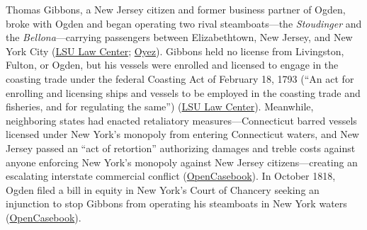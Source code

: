 \documentclass[12pt]{article}
\begin{document}
Thomas Gibbons, a New Jersey citizen and former business partner of Ogden, broke with Ogden and began operating two rival steamboats---the \textit{Stoudinger} and the \textit{Bellona}---carrying passengers between Elizabethtown, New Jersey, and New York City (\href{https://biotech.law.lsu.edu/cases/pp/Gibbons.htm}{LSU Law Center}; \href{https://www.oyez.org/cases/1789-1850/22us1}{Oyez}). Gibbons held no license from Livingston, Fulton, or Ogden, but his vessels were enrolled and licensed to engage in the coasting trade under the federal Coasting Act of February 18, 1793 (``An act for enrolling and licensing ships and vessels to be employed in the coasting trade and fisheries, and for regulating the same'') (\href{https://biotech.law.lsu.edu/cases/pp/Gibbons.htm}{LSU Law Center}). Meanwhile, neighboring states had enacted retaliatory measures---Connecticut barred vessels licensed under New York's monopoly from entering Connecticut waters, and New Jersey passed an ``act of retortion'' authorizing damages and treble costs against anyone enforcing New York's monopoly against New Jersey citizens---creating an escalating interstate commercial conflict (\href{https://opencasebook.org/casebooks/363-constitutional-law/resources/2.3.1-gibbons-v-ogden/}{OpenCasebook}). In October 1818, Ogden filed a bill in equity in New York's Court of Chancery seeking an injunction to stop Gibbons from operating his steamboats in New York waters (\href{https://opencasebook.org/casebooks/363-constitutional-law/resources/2.3.1-gibbons-v-ogden/}{OpenCasebook}).
\end{document}
